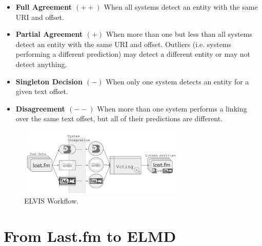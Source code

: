 \begin{itemize}
    \item \textbf{Full Agreement $(++)$} When all systems detect an entity with the same URI and offset.
    \item \textbf{Partial Agreement $(+)$} When more than one but less than all systems detect an entity with the same URI and offset. Outliers (i.e. systems performing a different prediction) may detect a different entity or may not detect anything.
    \item \textbf{Singleton Decision $(-)$} When only one system detects an entity for a given text offset.
    \item \textbf{Disagreement $(--)$} When more than one system performs a linking over the same text offset, but all of their predictions are different.
\end{itemize}



\begin{figure}[h!]
  \centering
	\includegraphics[height=3.25cm,width=8cm]{ch03_linking_pics/workflow_bn.pdf}
  \caption{ELVIS Workflow.}
  \label{fig:linking:workflow}
\end{figure}


\section{From Last.fm to ELMD}
\label{sec:linking:lastfm}

